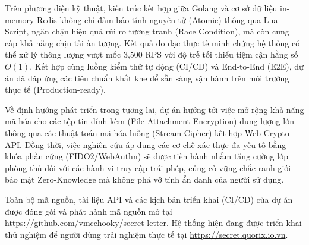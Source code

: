 \documentclass[13pt,a4paper]{extreport}
\begin{document}
Trên phương diện kỹ thuật, kiến trúc kết hợp giữa Golang và cơ sở dữ liệu in-memory Redis không chỉ đảm bảo tính nguyên tử (Atomic) thông qua Lua Script, ngăn chặn hiệu quả rủi ro tương tranh (Race Condition), mà còn cung cấp khả năng chịu tải ấn tượng. Kết quả đo đạc thực tế minh chứng hệ thống có thể xử lý thông lượng vượt mốc 3,500 RPS với độ trễ tối thiểu tiệm cận hằng số $O(1)$. Kết hợp cùng luồng kiểm thử tự động (CI/CD) và End-to-End (E2E), dự án đã đáp ứng các tiêu chuẩn khắt khe để sẵn sàng vận hành trên môi trường thực tế (Production-ready).

Về định hướng phát triển trong tương lai, dự án hướng tới việc mở rộng khả năng mã hóa cho các tệp tin đính kèm (File Attachment Encryption) dung lượng lớn thông qua các thuật toán mã hóa luồng (Stream Cipher) kết hợp Web Crypto API. Đồng thời, việc nghiên cứu áp dụng các cơ chế xác thực đa yếu tố bằng khóa phần cứng (FIDO2/WebAuthn) sẽ được tiến hành nhằm tăng cường lớp phòng thủ đối với các hành vi truy cập trái phép, củng cố vững chắc ranh giới bảo mật Zero-Knowledge mà không phá vỡ tính ẩn danh của người sử dụng.

Toàn bộ mã nguồn, tài liệu API và các kịch bản triển khai (CI/CD) của dự án được đóng gói và phát hành mã nguồn mở tại \url{https://github.com/vmcchooky/secret-letter}. Hệ thống hiện đang được triển khai thử nghiệm để người dùng trải nghiệm thực tế tại \url{https://secret.quorix.io.vn}.

\clearpage


\renewcommand{\bibname}{\centering \textbf{\fontsize{16pt}{18pt}\selectfont TÀI LIỆU THAM KHẢO}}

\printbibliography



% 
% 
\end{document}
